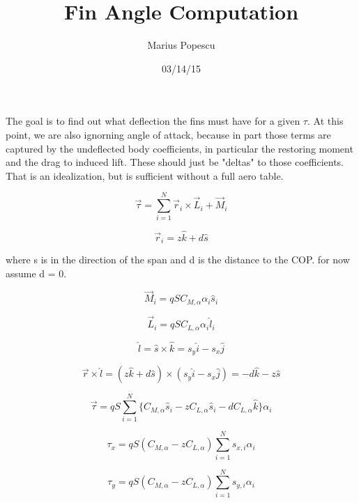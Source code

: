 \documentclass[12pt]{article}
\title{Fin Angle Computation}
\author{Marius Popescu}
\date{03/14/15}
\begin{document}
\maketitle

The goal is to find out what deflection the fins must have for a given $\tau$. At this point, we are also ignorning angle of attack, because in part those terms are captured by the undeflected body coefficients, in particular the restoring moment and the drag to induced lift. These should just be "deltas" to those coefficients. That is an idealization, but is sufficient without a full aero table.

\begin{equation}
  \vec{\tau} = \sum_{i = 1}^{N} \vec{r}_i \times \vec{L}_i + \vec{M}_i
\end{equation}

\begin{equation}
  \vec{r}_i = z\hat{k} + d \hat{s}
\end{equation}

where s is in the direction of the span and d is the distance to the COP. for now assume d = 0. 

\begin{equation}
  \vec{M}_i = q S C_{M,\alpha} \alpha_i \hat{s}_i 
\end{equation}

\begin{equation}
  \vec{L}_i = q S C_{L,\alpha} \alpha_i \hat{l}_i
\end{equation}

\begin{equation}
  \hat{l} = \hat{s} \times \hat{k} = s_y \hat{i} - s_x \hat{j}
\end{equation}

\begin{equation}
  \vec{r} \times \hat{l} = (z\hat{k} + d \hat{s}) \times (s_y \hat{i} - s_x \hat{j}) = -d\hat{k}- z\hat{s}
\end{equation}

\begin{equation}
  \vec{\tau} = q S\sum_{i = 1}^{N} \{C_{M,\alpha} \hat{s}_i - z C_{L,\alpha}\hat{s}_i - d C_{L,\alpha} \hat{k} \} \alpha_i
\end{equation}

\begin{equation}
  \tau_x = q S (C_{M,\alpha} - z C_{L,\alpha}) \sum_{i = 1}^{N} s_{x,i}\alpha_i
\end{equation}

\begin{equation}
  \tau_y = q S (C_{M,\alpha} - z C_{L,\alpha})\sum_{i = 1}^{N} s_{y,i} \alpha_i
\end{equation}
\end{document}
